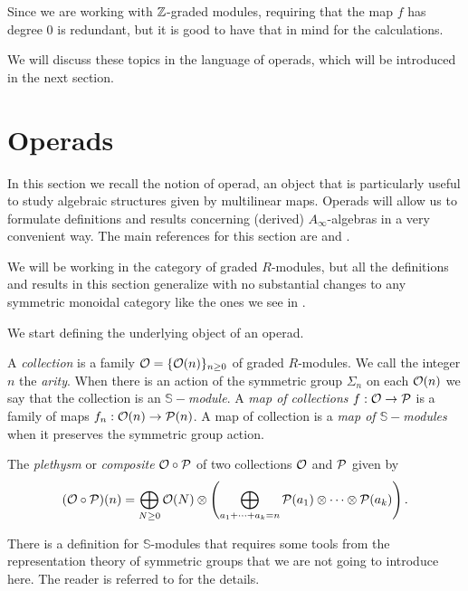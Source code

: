 \documentclass[Thesis.tex]{subfiles}
\begin{document}
Since we are working with $\mathbb{Z}$-graded modules, requiring that the map $f$ has degree 0 is redundant, but it is good to have that in mind for the calculations.

We will discuss these topics in the language of operads, which will be introduced in the next section.

\section{Operads}

In this section we recall the notion of operad, an object that is particularly useful to study algebraic structures given by multilinear maps. Operads will allow us to formulate definitions and results concerning (derived) $A_\infty$-algebras in a very convenient way. The main references for this section are \cite{lodayvallette} and \cite{ward}.

We will be working in the category of graded $R$-modules, but all the definitions and results in this section generalize with no substantial changes to any symmetric monoidal category like the ones we see in . 

We start defining the underlying object of an operad.

\begin{defin}\label{collections}
A \emph{collection} is a family ${\mathcal O}=\{{\mathcal O}(n)\}_{n\geq 0}$ of graded $R$-modules. We call the integer $n$ the \emph{arity}. When there is an action of the symmetric group $\Sigma_n$ on each ${\mathcal O}(n)$ we say that the collection is an \emph{$\mathbb{S}-$module}. A \emph{map of collections} $f:{\mathcal O}\to\mathcal{P}$ is a family of maps $f_n:{\mathcal O}(n)\to\mathcal{P}(n)$. A map of collection is a \emph{map of $\mathbb{S}-$modules} when it preserves the symmetric group action.
\end{defin}

\begin{defin}
The \emph{plethysm} or \emph{composite} ${\mathcal O}\circ\mathcal{P}$ of two collections ${\mathcal O}$ and $\mathcal{P}$ given by
\[({\mathcal O}\circ\mathcal{P})(n)=\bigoplus_{N\geq 0}{\mathcal O}(N)\otimes \left(\bigoplus_{a_1+\cdots+a_k=n} \mathcal{P}(a_1)\otimes\cdots\otimes \mathcal{P}(a_k)\right).\]
\end{defin}
There is a definition for $\mathbb{S}$-modules that requires some tools from the representation theory of symmetric groups that we are not going to introduce here. The reader is referred to \cite{lodayvallette} for the details. 
\end{document}
